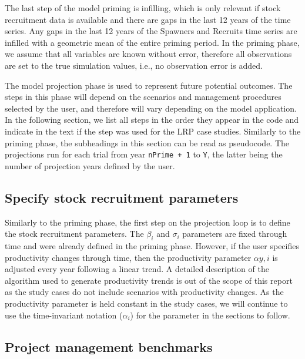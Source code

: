 \documentclass[11pt]{book}
\begin{document}
The last step of the model priming is infilling, which is only relevant if stock recruitment data is available and there are gaps in the last 12 years of the time series. Any gaps in the last 12 years of the Spawners and Recruits time series are infilled with a geometric mean of the entire priming period. In the priming phase, we assume that all variables are known without error, therefore all observations are set to the true simulation values, i.e., no observation error is added.

\hypertarget{model-projections}{%
\label{model-projections}}

The model projection phase is used to represent future potential outcomes. The steps in this phase will depend on the scenarios and management procedures selected by the user, and therefore will vary depending on the model application. In the following section, we list all steps in the order they appear in the code and indicate in the text if the step was used for the LRP case studies. Similarly to the priming phase, the subheadings in this section can be read as pseudocode. The projections run for each trial from year \texttt{nPrime\ +\ 1} to \texttt{Y}, the latter being the number of projection years defined by the user.

\hypertarget{specify-stock-recruitment-parameters}{%
\subsection{Specify stock recruitment parameters}\label{specify-stock-recruitment-parameters}}

Similarly to the priming phase, the first step on the projection loop is to define the stock recruitment parameters. The \(\beta_{i}\) and \(\sigma_{i}\) parameters are fixed through time and were already defined in the priming phase. However, if the user specifies productivity changes through time, then the productivity parameter \(\alpha{y,i}\) is adjusted every year following a linear trend. A detailed description of the algorithm used to generate productivity trends is out of the scope of this report as the study cases do not include scenarios with productivity changes. As the productivity parameter is held constant in the study cases, we will continue to use the time-invariant notation (\(\alpha_{i}\)) for the parameter in the sections to follow.

\hypertarget{project-management-benchmarks}{%
\subsection{Project management benchmarks}\label{project-management-benchmarks}}
\end{document}
